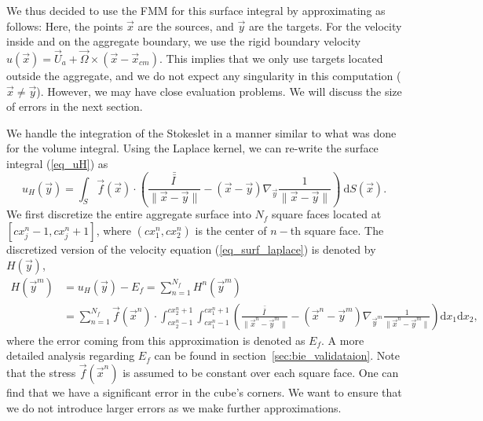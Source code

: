 We thus decided to use the FMM for this surface integral by approximating as follows:
Here, the points $\vec{x}$ are the sources, and $\vec{y}$ are the targets. 
For the velocity inside and on the aggregate boundary, we use the rigid boundary velocity $u(\vec{x}) = \vec{U}_a + \vec{\Omega} \times \left(\vec{x} - \vec{x}_{cm} \right)$. This implies that we only use targets located outside the aggregate, and we do not expect any singularity in this computation ($\vec{x} \neq \vec{y}$). However, we may have close evaluation problems. We will discuss the size of errors in the next section. 
\par
We handle the integration of the Stokeslet in a manner similar to what was done for the volume integral. 
Using the Laplace kernel, we can re-write the surface integral (\ref{eq_uH}) as
\begin{equation}
	u_H(\vec{y}) =
	\int_S 
	\vec{f}(\vec{x}) \cdot
  	\left(
  	\frac{\bar{\bar{I \ }}}{\|\vec{x} - \vec{y}\|}
  	- \left( \vec{x} - \vec{y} \right)
  	 \nabla_{\vec{y}}
  	\frac{1}{\|\vec{x} - \vec{y}\|}
  	\right)
	  \ \text{d} S(\vec{x}).
 \label{eq_surf_laplace}
\end{equation}
We first discretize the entire aggregate surface into $N_f$ square faces located at $[cx_j^n-1, cx^n_j+1]$, where $(cx^n_1, cx^n_2)$ is the center of $n-$th square face. The discretized version of the velocity equation (\ref{eq_surf_laplace}) is denoted by $H(\vec{y})$,
\begin{align}
	H(\vec{y}^m) & = u_H(\vec{y}) - E_f
	 = \sum_{n = 1}^{N_f} H^n(\vec{y}^m) 
	\nonumber \\
	& = \sum_{n = 1}^{N_f} 
	\vec{f}(\vec{x}^n) \cdot
	\int_{cx^n_2-1}^{cx^n_2+1} \int_{cx_1^n-1}^{cx_1^n+1}
  	\left(
  	\frac{\bar{\bar{I \ }}}{\|\vec{x}^n - \vec{y}^m\|}
  	- \left( \vec{x}^n - \vec{y}^m \right)
  	 \nabla_{\vec{y}^m}
  	\frac{1}{\|\vec{x}^n - \vec{y}^m\|}
  	\right)
	  \text{d} x_1  \text{d} x_2
	  ,
 \label{eq_surf_fmm_N_f}
\end{align}
where the error coming from this approximation is denoted as $E_f$. A more detailed analysis regarding $E_f$ can be found in section~\ref{sec:bie_validataion}.
 Note that the stress $\vec{f}(\vec{x}^n)$ is assumed to be constant over each square face.  One can find that we have a significant error in the cube's corners. We want to ensure that we do not introduce larger errors as we make further approximations. 

